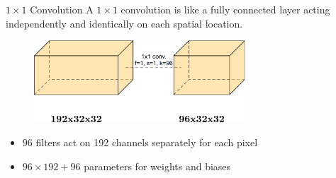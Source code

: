 \begin{frame}[allowframebreaks]

\begin{myconceptblock}{7.13}{$1 \times 1$ Convolution}
    A $1 \times 1$ convolution is like a fully connected layer acting independently and identically on each spatial location.

    \begin{figure}[H]
        \centering
        \includegraphics[width=0.7\textwidth]{.././assets/7.11.png}
    \end{figure}

    \begin{itemize}
        \item 96 filters act on 192 channels separately for each pixel
        \item $96 \times 192+96$ parameters for weights and biases
    \end{itemize}
\end{myconceptblock}

\end{frame}

